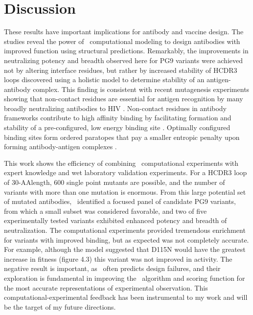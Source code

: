 \section{Discussion}
These results have important implications for antibody and vaccine design. The studies reveal the power of \rosetta~computational modeling to design antibodies with improved function using structural predictions. Remarkably, the improvements in neutralizing potency and breadth observed here for PG9 variants were achieved not by altering interface residues, but rather by increased stability of HCDR3 loops discovered using a holistic model to determine stability of an antigen-antibody complex. This finding is consistent with recent mutagenesis experiments showing that non-contact residues are essential for antigen recognition by many broadly neutralizing antibodies to HIV \citep{Klein:2013iz}. Non-contact residues in antibody frameworks contribute to high affinity binding by facilitating formation and stability of a pre-configured, low energy binding site \citep{Willis:2013dd,Manivel:2000wk,Marlow:2010jl,Wedemayer:1997wn,Schmidt:2013ka}. Optimally configured binding sites form ordered paratopes that pay a smaller entropic penalty upon forming antibody-antigen complexes \citep{Marlow:2010jl}.

This work shows the efficiency of combining \rosettadesign~computational experiments with expert knowledge and wet laboratory validation experiments. For a HCDR3 loop of 30-AAlength, 600 single point mutants are possible, and the number of variants with more than one mutation is enormous. From this large potential set of mutated antibodies, \rosettadesign~identified a focused panel of candidate PG9 variants, from which a small subset was considered favorable, and two of five experimentally tested variants exhibited enhanced potency and breadth of neutralization. The computational experiments provided tremendous enrichment for variants with improved binding, but as expected was not completely accurate. For example, although the model suggested that D115N would have the greatest increase in fitness (figure 4.3) this variant was not improved in activity.
The negative result is important, as \rosetta~often predicts design failures, and their exploration is fundamental in improving the \rosetta~algorithm and scoring function for the most accurate representations of experimental observation. This computational-experimental feedback has been instrumental to my work and will be the target of my future directions.

